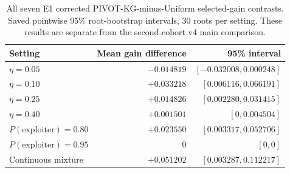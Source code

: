 \begin{table}[t]
\centering
\caption{All seven E1 corrected PIVOT-KG-minus-Uniform selected-gain contrasts. Saved pointwise 95\% root-bootstrap intervals, 30 roots per setting. These results are separate from the second-cohort v4 main comparison.}
\label{add20260923:leduc:e1-table}
\small
\begin{tabular}{lrr}
\hline
Setting & Mean gain difference & 95\% interval \\
\hline
$\eta=0.05$ & $-0.014819$ & $[-0.032008,0.000248]$ \\
$\eta=0.10$ & $+0.033218$ & $[0.006116,0.066191]$ \\
$\eta=0.25$ & $+0.014826$ & $[0.002280,0.031415]$ \\
$\eta=0.40$ & $+0.001501$ & $[0,0.004504]$ \\
$P(\mathrm{exploiter})=0.80$ & $+0.023550$ & $[0.003317,0.052706]$ \\
$P(\mathrm{exploiter})=0.95$ & $0$ & $[0,0]$ \\
Continuous mixture & $+0.051202$ & $[0.003287,0.112217]$ \\
\hline
\end{tabular}
\end{table}
